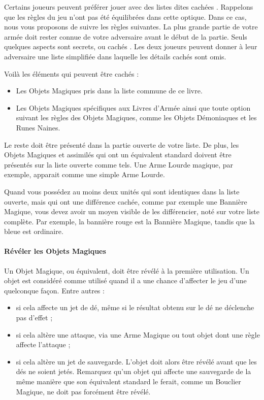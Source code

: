 Certains joueurs peuvent préférer jouer avec des listes dites \og cachées \fg{}. Rappelons que les règles du jeu n'ont pas été équilibrées dans cette optique. Dans ce cas, nous vous proposons de suivre les règles suivantes. La plus grande partie de votre armée doit rester connue de votre adversaire avant le début de la partie. Seuls quelques aspects sont secrets, ou \og cachés \fg{}. Les deux joueurs peuvent donner à leur adversaire une liste simplifiée dans laquelle les détails cachés sont omis.

Voilà les éléments qui peuvent être cachés : 

\begin{itemize}[label={-}]
\item Les Objets Magiques pris dans la liste commune de ce livre.
\item Les Objets Magiques spécifiques aux Livres d'Armée ainsi que toute option suivant les règles des Objets Magiques, comme les Objets Démoniaques et les Runes Naines.
\end{itemize}

Le reste doit être présenté dans la partie ouverte de votre liste. De plus, les Objets Magiques et assimilés qui ont un équivalent standard doivent être présentés sur la liste ouverte comme tels. Une Arme Lourde magique, par exemple, apparait comme une simple Arme Lourde.

Quand vous possédez au moins deux unités qui sont identiques dans la liste ouverte, mais qui ont une différence cachée, comme par exemple une Bannière Magique, vous devez avoir un moyen visible de les différencier, noté sur votre liste complète. Par exemple, la bannière rouge est la Bannière Magique, tandis que la bleue est ordinaire.

\paragraph{Révéler les Objets Magiques}

Un Objet Magique, ou équivalent, doit être révélé à la première utilisation. Un objet est considéré comme utilisé quand il a une chance d'affecter le jeu d'une quelconque façon. Entre autres :
\begin{itemize}[label={-}]
\item si cela affecte un jet de dé, même si le résultat obtenu sur le dé ne déclenche pas d'effet ;
\item si cela altère une attaque, via une Arme Magique ou tout objet dont une règle affecte l'attaque ;
\item si cela altère un jet de sauvegarde. L'objet doit alors être révélé avant que les dés ne soient jetés. Remarquez qu'un objet qui affecte une sauvegarde de la même manière que son équivalent standard le ferait, comme un Bouclier Magique, ne doit pas forcément être révélé.
\end{itemize}

